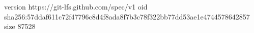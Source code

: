 version https://git-lfs.github.com/spec/v1
oid sha256:57ddaf611c72f47796c8d4f8ada8f7b3c78f322bb77dd53ae1e4744578642857
size 87528
